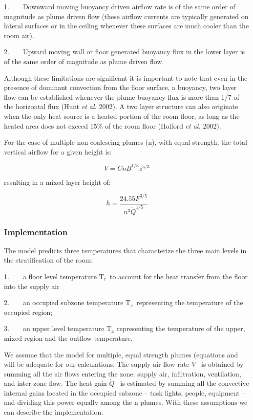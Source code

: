 1.~~~~Downward moving buoyancy driven airflow rate is of the same order of magnitude as plume driven flow (these airflow currents are typically generated on lateral surfaces or in the ceiling whenever these surfaces are much cooler than the room air).

2.~~~~Upward moving wall or floor generated buoyancy flux in the lower layer is of the same order of magnitude as plume driven flow.

Although these limitations are significant it is important to note that even in the presence of dominant convection from the floor surface, a buoyancy, two layer flow can be established whenever the plume buoyancy flux is more than 1/7 of the horizontal flux (Hunt \emph{et al.} 2002). A two layer structure can also originate when the only heat source is a heated portion of the room floor, as long as the heated area does not exceed 15\% of the room floor (Holford \emph{et al.} 2002).

For the case of multiple non-coalescing plumes (n), with equal strength, the total vertical airflow for a given height is:

\begin{equation}
  \dot{V} = CnB^{1/3}z^{5/3}
\end{equation}

resulting in a mixed layer height of:

\begin{equation}
  h = \frac{24.55F^{3/5}}{{n^3 \dot{Q}}^{1/5}}
\end{equation}

\subsubsection{Implementation}\label{implementation}

The model predicts three temperatures that characterize the three main levels in the stratification of the room:

1.~~~~a floor level temperature T\(_{r}\)~to account for the heat transfer from the floor into the supply air

2.~~~~an occupied subzone temperature T\(_{c}\)~representing the temperature of the occupied region;

3.~~~~an upper level temperature T\(_{x}\) representing the temperature of the upper, mixed region and the outflow temperature.

We assume that the model for multiple, equal strength plumes (equations and will be adequate for our calculations. The supply air flow rate \(\dot V\) ~is obtained by summing all the air flows entering the zone: supply air, infiltration, ventilation, and inter-zone flow. The heat gain \(\dot Q\) ~is estimated by summing all the convective internal gains located in the occupied subzone -- task lights, people, equipment -- and dividing this power equally among the n plumes. With these assumptions we can describe the implementation.

